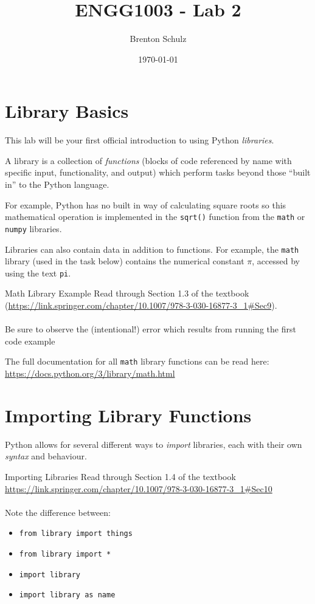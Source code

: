 \documentclass{lab}
\title{ENGG1003 - Lab 2}
\author{Brenton Schulz}
\date{\today}
\begin{document}
\maketitle

\section{Library Basics}

This lab will be your first official introduction to using Python \textit{libraries}.

A library is a collection of \textit{functions} (blocks of code referenced by name with specific input, functionality, and output) which perform tasks beyond those ``built in'' to the Python language.

For example, Python has no built in way of calculating square roots so this mathematical operation is implemented in the \texttt{sqrt()} function from the \texttt{math} or \texttt{numpy} libraries.

Libraries can also contain data in addition to functions. For example, the \texttt{math} library (used in the task below) contains the numerical constant $\pi$, accessed by using the text \texttt{pi}.

\begin{task}{Math Library Example}{}
Read through Section 1.3 of the textbook (\url{https://link.springer.com/chapter/10.1007/978-3-030-16877-3_1#Sec9}).
\\~\\
Be sure to observe the (intentional!) error which results from running the first code example
\end{task}

The full documentation for all \texttt{math} library functions can be read here: \url{https://docs.python.org/3/library/math.html}

\section{Importing Library Functions}

Python allows for several different ways to \textit{import} libraries, each with their own \textit{syntax} and behaviour.

\begin{task}{Importing Libraries}{}
Read through Section 1.4 of the textbook \url{https://link.springer.com/chapter/10.1007/978-3-030-16877-3_1#Sec10}
\\~\\
Note the difference between:

\begin{itemize}
\item \texttt{from library import things}
\item \texttt{from library import *}
\item \texttt{import library}
\item \texttt{import library as name}
\end{itemize}

\end{task}
\end{document}
